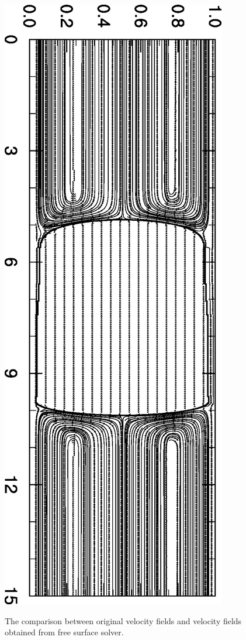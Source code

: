 \documentclass{article}
\begin{document}
\begin{figure}
\includegraphics[angle=90,width=\textwidth]{Figures/performed.eps}\\
\caption{The comparison between original velocity fields and velocity fields obtained from free surface solver. \label{fig:streamlines:tweaked:velocity}}
\end{figure}
\end{document}
